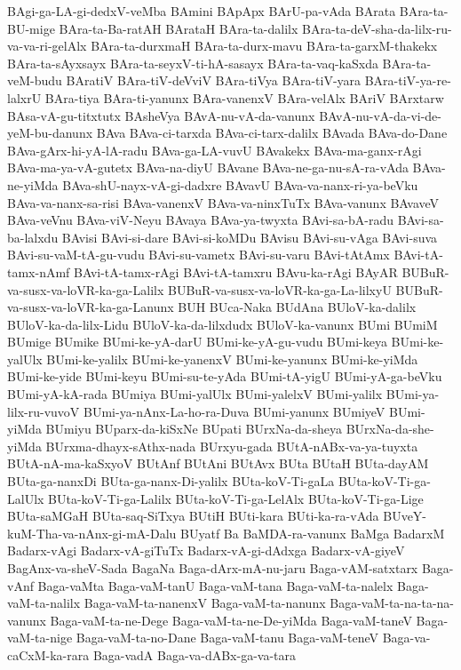 {BAgi-ga-LA-gi-dedxV-veMba
BAmini
BApApx
BArU-pa-vAda
BArata
BAra-ta-BU-mige
BAra-ta-Ba-ratAH
BArataH
BAra-ta-dalilx
BAra-ta-deV-sha-da-lilx-ru-va-va-ri-gelAlx
BAra-ta-durxmaH
BAra-ta-durx-mavu
BAra-ta-garxM-thakekx
BAra-ta-sAyxsayx
BAra-ta-seyxV-ti-hA-sasayx
BAra-ta-vaq-kaSxda
BAra-ta-veM-budu
BAratiV
BAra-tiV-deVviV
BAra-tiVya
BAra-tiV-yara
BAra-tiV-ya-re-lalxrU
BAra-tiya
BAra-ti-yanunx
BAra-vanenxV
BAra-velAlx
BAriV
BArxtarw
BAsa-vA-gu-titxtutx
BAsheVya
BAvA-nu-vA-da-vanunx
BAvA-nu-vA-da-vi-de-yeM-bu-danunx
BAva
BAva-ci-tarxda
BAva-ci-tarx-dalilx
BAvada
BAva-do-Dane
BAva-gArx-hi-yA-lA-radu
BAva-ga-LA-vuvU
BAvakekx
BAva-ma-ganx-rAgi
BAva-ma-ya-vA-gutetx
BAva-na-diyU
BAvane
BAva-ne-ga-nu-sA-ra-vAda
BAva-ne-yiMda
BAva-shU-nayx-vA-gi-dadxre
BAvavU
BAva-va-nanx-ri-ya-beVku
BAva-va-nanx-sa-risi
BAva-vanenxV
BAva-va-ninxTuTx
BAva-vanunx
BAvaveV
BAva-veVnu
BAva-viV-Neyu
BAvaya
BAva-ya-twyxta
BAvi-sa-bA-radu
BAvi-sa-ba-lalxdu
BAvisi
BAvi-si-dare
BAvi-si-koMDu
BAvisu
BAvi-su-vAga
BAvi-suva
BAvi-su-vaM-tA-gu-vudu
BAvi-su-vametx
BAvi-su-varu
BAvi-tAtAmx
BAvi-tA-tamx-nAmf
BAvi-tA-tamx-rAgi
BAvi-tA-tamxru
BAvu-ka-rAgi
BAyAR
BUBuR-va-susx-va-loVR-ka-ga-Lalilx
BUBuR-va-susx-va-loVR-ka-ga-La-lilxyU
BUBuR-va-susx-va-loVR-ka-ga-Lanunx
BUH
BUca-Naka
BUdAna
BUloV-ka-dalilx
BUloV-ka-da-lilx-Lidu
BUloV-ka-da-lilxdudx
BUloV-ka-vanunx
BUmi
BUmiM
BUmige
BUmike
BUmi-ke-yA-darU
BUmi-ke-yA-gu-vudu
BUmi-keya
BUmi-ke-yalUlx
BUmi-ke-yalilx
BUmi-ke-yanenxV
BUmi-ke-yanunx
BUmi-ke-yiMda
BUmi-ke-yide
BUmi-keyu
BUmi-su-te-yAda
BUmi-tA-yigU
BUmi-yA-ga-beVku
BUmi-yA-kA-rada
BUmiya
BUmi-yalUlx
BUmi-yalelxV
BUmi-yalilx
BUmi-ya-lilx-ru-vuvoV
BUmi-ya-nAnx-La-ho-ra-Duva
BUmi-yanunx
BUmiyeV
BUmi-yiMda
BUmiyu
BUparx-da-kiSxNe
BUpati
BUrxNa-da-sheya
BUrxNa-da-she-yiMda
BUrxma-dhayx-sAthx-nada
BUrxyu-gada
BUtA-nABx-va-ya-tuyxta
BUtA-nA-ma-kaSxyoV
BUtAnf
BUtAni
BUtAvx
BUta
BUtaH
BUta-dayAM
BUta-ga-nanxDi
BUta-ga-nanx-Di-yalilx
BUta-koV-Ti-gaLa
BUta-koV-Ti-ga-LalUlx
BUta-koV-Ti-ga-Lalilx
BUta-koV-Ti-ga-LelAlx
BUta-koV-Ti-ga-Lige
BUta-saMGaH
BUta-saq-SiTxya
BUtiH
BUti-kara
BUti-ka-ra-vAda
BUveY-kuM-Tha-va-nAnx-gi-mA-Dalu
BUyatf
Ba
BaMDA-ra-vanunx
BaMga
BadarxM
Badarx-vAgi
Badarx-vA-giTuTx
Badarx-vA-gi-dAdxga
Badarx-vA-giyeV
BagAnx-va-sheV-Sada
BagaNa
Baga-dArx-mA-nu-jaru
Baga-vAM-satxtarx
Baga-vAnf
Baga-vaMta
Baga-vaM-tanU
Baga-vaM-tana
Baga-vaM-ta-nalelx
Baga-vaM-ta-nalilx
Baga-vaM-ta-nanenxV
Baga-vaM-ta-nanunx
Baga-vaM-ta-na-ta-na-vanunx
Baga-vaM-ta-ne-Dege
Baga-vaM-ta-ne-De-yiMda
Baga-vaM-taneV
Baga-vaM-ta-nige
Baga-vaM-ta-no-Dane
Baga-vaM-tanu
Baga-vaM-teneV
Baga-va-caCxM-ka-rara
Baga-vadA
Baga-va-dABx-ga-va-tara
}
